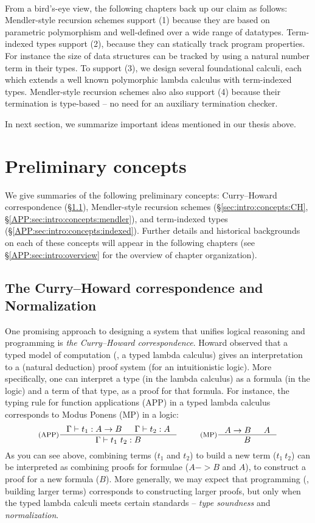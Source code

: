 \paragraph{}
From a bird's-eye view, the following chapters back up our claim as follows:
Mendler-style recursion schemes support (1) because they are based on
parametric polymorphism and well-defined over a wide range of datatypes.
Term-indexed types support (2), because they can statically track program
properties. For instance the size of data structures can be tracked by using
a natural number term in their types.
To support (3), we design several foundational calculi, each which extends
a well known polymorphic lambda calculus with term-indexed types.
Mendler-style recursion schemes also also support (4) because their
termination is type-based -- no need for an auxiliary termination checker.

In next section, we summarize important ideas mentioned in our thesis above.

\section{Preliminary concepts}\label{APP:sec:intro:concepts}
We give summaries of the following preliminary concepts:
Curry--Howard correspondence (\S\ref{APP:sec:intro:concepts:CH}),
Mendler-style recursion schemes
(\S\ref{sec:intro:concepts:CH}, \S\ref{APP:sec:intro:concepts:mendler}),
and term-indexed types (\S\ref{APP:sec:intro:concepts:indexed}).
Further details and historical backgrounds on each of these concepts
will appear in the following chapters (see \S\ref{APP:sec:intro:overview}
for the overview of chapter organization).

\subsection{The Curry--Howard correspondence and Normalization}
\label{APP:sec:intro:concepts:CH}
One promising approach to designing a system that unifies
logical reasoning and programming is \emph{the Curry--Howard correspondence}.
Howard \cite{Howard69} observed that a typed model of computation
(\ie, a typed lambda calculus) gives an interpretation to a (natural deduction)
proof system (for an intuitionistic logic). More specifically, one can interpret
a type (in the lambda calculus) as a formula (in the logic) and
a term of that type, as a proof for that formula. For instance,
the typing rule for function applications (APP) in a typed lambda calculus
corresponds to Modus Ponens (MP) in a logic:
\[ \inference[(APP)]{\Gamma |- t_1 : A -> B & \Gamma |- t_2 : A}{
        \Gamma |- t_1~t_2 : B}
 ~~~~~~~~
   \inference[(MP)]{A -> B & A}{B}
\]
As you can see above, combining terms ($t_1$ and $t_2$) to build a new term
($t_1~t_2$) can be interpreted as combining proofs for formulae
($A -> B$ and $A$), to construct a proof for a new formula ($B$).
More generally, we may expect that programming (\ie, building larger terms)
corresponds to constructing larger proofs, but only when the typed lambda calculi
meets certain standards -- \emph{type soundness} and \emph{normalization}.


